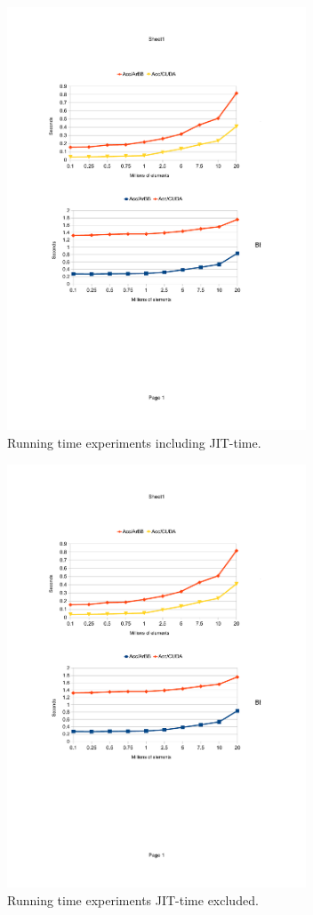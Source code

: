 \begin{figure}
  \begin{center}
   \includegraphics[width=3.5in]{./arbb/jit}    
  \end{center}
\vspace{-5mm}
  \caption{Running time experiments including JIT-time.} 
  \label{f:jit}
\end{figure}

\begin{figure}
  \begin{center}
   \includegraphics[width=3.5in]{./arbb/nojit}    
  \end{center}
\vspace{-5mm}
  \caption{Running time experiments JIT-time excluded.}
  \label{f:nojit}
\end{figure}


